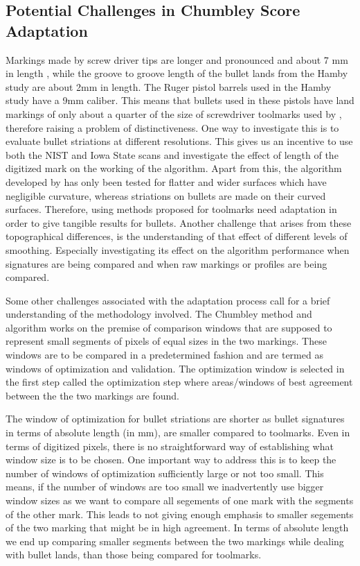 \documentclass[12pt]{article}
\begin{document}
\subsection{Potential Challenges in Chumbley Score
Adaptation}\label{potential-challenges-in-chumbley-score-adaptation}

Markings made by screw driver tips \citep{chumbley} are longer and
pronounced and about 7 mm in length \citep{manytoolmarks1}, while the
groove to groove length of the bullet lands from the Hamby study
\citep{hamby} are about 2mm in length. The Ruger pistol barrels used in
the Hamby study have a 9mm caliber. This means that bullets used in
these pistols have land markings of only about a quarter of the size of
screwdriver toolmarks used by \citet{chumbley, hadler}, therefore
raising a problem of distinctiveness. One way to investigate this is to
evaluate bullet striations at different resolutions. This gives us an
incentive to use both the NIST and Iowa State scans and investigate the
effect of length of the digitized mark on the working of the algorithm.
Apart from this, the algorithm developed by \citet{hadler} has only been
tested for flatter and wider surfaces which have negligible curvature,
whereas striations on bullets are made on their curved surfaces.
Therefore, using methods proposed for toolmarks need adaptation in order
to give tangible results for bullets. Another challenge that arises from
these topographical differences, is the understanding of that effect of
different levels of smoothing. Especially investigating its effect on
the algorithm performance when signatures are being compared and when
raw markings or profiles are being compared.

Some other challenges associated with the adaptation process call for a
brief understanding of the methodology involved. The Chumbley method and
algorithm works on the premise of comparison windows that are supposed
to represent small segments of pixels of equal sizes in the two
markings. These windows are to be compared in a predetermined fashion
and are termed as windows of optimization and validation. The
optimization window is selected in the first step called the
optimization step where areas/windows of best agreement between the the
two markings are found.

The window of optimization for bullet striations are shorter as bullet
signatures in terms of absolute length (in mm), are smaller compared to
toolmarks. Even in terms of digitized pixels, there is no
straightforward way of establishing what window size is to be chosen.
One important way to address this is to keep the number of windows of
optimization sufficiently large or not too small. This means, if the
number of windows are too small we inadvertently use bigger window sizes
as we want to compare all segements of one mark with the segments of the
other mark. This leads to not giving enough emphasis to smaller
segements of the two marking that might be in high agreement. In terms
of absolute length we end up comparing smaller segments between the two
markings while dealing with bullet lands, than those being compared for
toolmarks.
\end{document}
